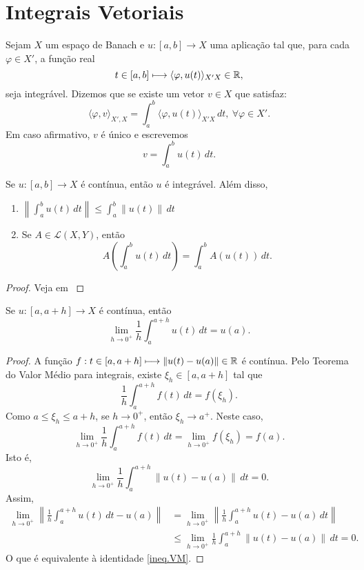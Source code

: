 \section{Integrais Vetoriais}

\begin{definition}
Sejam $X$ um espaço de Banach e $u:[a,b]\longrightarrow X$ uma aplicação tal que, para cada $\varphi\in X'$,  a função real
\[t\in [a,b] \longmapsto \langle\varphi, u(t) \rangle_{X'X}\in \mathbb{R},\]
seja integrável. Dizemos que  se existe um vetor $v\in X$ que satisfaz:
\[\langle \varphi, v\rangle_{X',X}=\int_a^b \langle\varphi, u(t) \rangle_{X'X}\,dt,\ \forall \varphi\in X'.\]
Em caso afirmativo, $v$ é único e escrevemos
\[v=\int_a^b u(t)\,dt.\]
\end{definition}

\begin{proposition}\label{KthA3.2}
Se $u:[a,b]\longrightarrow X$ é {contínua}, então $u$ é integrável. Além disso, 
\begin{enumerate}
    \item $\displaystyle\left\|\int_a^b u(t)\,dt\right\|\leq \int_a^b \|u(t)\|\,dt$
    \item Se $A\in \mathcal{L}(X,Y)$, então
    \[ A\left(\int_a^b u(t)\,dt\right)=\int_a^b A(u(t))\,dt. \]
\end{enumerate}
\end{proposition}
\begin{proof}
Veja em \cite[Theorem A3.2]{kesavan2015topics}
\end{proof}

\begin{proposition}
Se $u:[a,a+h]\longrightarrow X$ é {contínua}, então
\begin{equation}\label{ineq.VM}
\lim\limits_{h\to 0^+} \frac{1}{h}\int_a^{a+h} u(t)\,dt = u(a).
\end{equation}
\end{proposition}
\begin{proof}
A função  $f:t\in [a,a+h]\longmapsto \|u(t)-u(a)\|\in \mathbb{R}$ é contínua. Pelo Teorema do Valor Médio para integrais, existe $\xi_h\in [a,a+h]$ tal que 
\[
\frac{1}{h}\int_a^{a+h} f(t)\,dt=f(\xi_h).
\]
Como $a\leq \xi_h\leq a+h$, se $h\to 0^+$, então $\xi_h\to a^+$. Neste caso, 
\[
\lim_{h\to 0^+}\frac{1}{h}\int_a^{a+h} f(t)\,dt=\lim_{h\to 0^+}f(\xi_h)=f(a).
\]
Isto é, 
\begin{equation*}
\lim_{h\to 0^+}\frac{1}{h}\int_a^{a+h} \|u(t)-u(a)\|\,dt=0.
\end{equation*}
Assim, 
\begin{align*}
\lim_{h\to 0^+}\left\|\frac{1}{h}\int_a^{a+h} u(t)\,dt -u(a)\right\|& =
\lim_{h\to 0^+}\left\|\frac{1}{h}\int_a^{a+h} u(t)-u(a)\,dt\right\|\\
&\leq \lim_{h\to 0^+}\frac{1}{h}\int_a^{a+h}\left\| u(t)-u(a)\right\|\,dt
=0.
\end{align*}
O que é equivalente à identidade \eqref{ineq.VM}.
\end{proof}